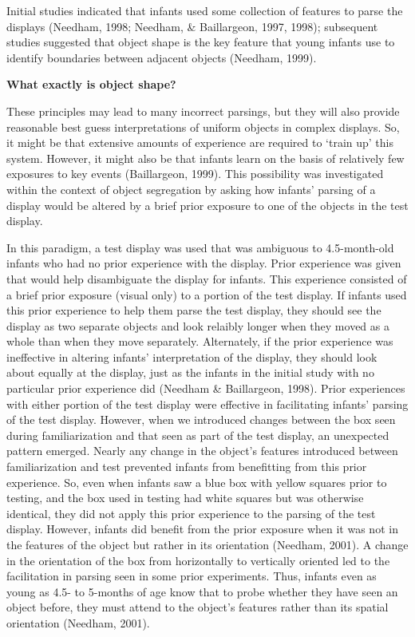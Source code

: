 Initial studies indicated that infants used some collection of
features to parse the displays (Needham, 1998; Needham, \& Baillargeon,
1997, 1998); subsequent studies suggested that object shape is the key
feature that young infants use to identify boundaries between adjacent
objects (Needham, 1999).

{
\bf What exactly is object shape?
}


These principles may lead to many incorrect parsings, but they will
also provide reasonable best guess interpretations of uniform objects
in complex displays.  So, it might be that extensive amounts of
experience are required to `train up' this system.
However, it might also be that infants learn on the basis of
relatively few exposures to key events (Baillargeon, 1999).  This
possibility was investigated within the context of object segregation
by asking how infants' parsing of a display would be altered
by a brief prior exposure to one of the objects in the test display.


In this paradigm, a test display was used that was ambiguous to
4.5-month-old infants who had no prior experience with the display.
Prior experience was given that would help disambiguate the display
for infants.  This experience consisted of a brief prior exposure
(visual only) to a portion of the test display.  If infants used this
prior experience to help them parse the test display, they should see
the display as two separate objects and look relaibly longer when they
moved as a whole than when they move separately.  Alternately, if the
prior experience was ineffective in altering infants'
interpretation of the display, they should look about equally at the
display, just as the infants in the initial study with no particular
prior experience did (Needham \& Baillargeon, 1998).  Prior experiences
with either portion of the test display were effective in facilitating
infants' parsing of the test display.  However, when we
introduced changes between the box seen during familiarization and
that seen as part of the test display, an unexpected pattern emerged.
Nearly any change in the object's features introduced between
familiarization and test prevented infants from benefitting from this
prior experience.  So, even when infants saw a blue box with yellow
squares prior to testing, and the box used in testing had white
squares but was otherwise identical, they did not apply this prior
experience to the parsing of the test display.  However, infants did
benefit from the prior exposure when it was not in the features of the
object but rather in its orientation (Needham, 2001).  A change in the
orientation of the box from horizontally to vertically oriented led to
the facilitation in parsing seen in some prior experiments.  Thus,
infants even as young as 4.5- to 5-months of age know that to probe
whether they have seen an object before, they must attend to the
object's features rather than its spatial orientation
(Needham, 2001).

